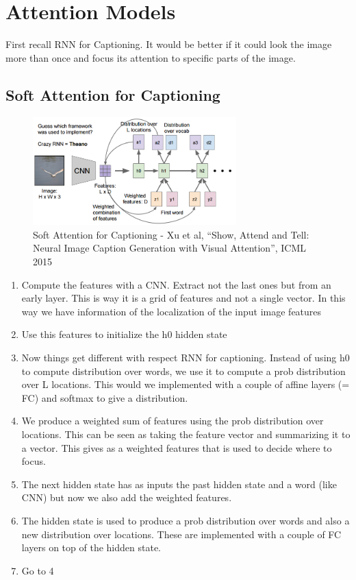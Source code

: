 \chapter{Attention Models}
First recall RNN for Captioning. It would be better if it could look the image more than once and focus its attention to specific parts of the image.

\section*{Soft Attention for Captioning}
\begin{figure}[h]
  \centering
  \includegraphics[width=0.7\textwidth]{Images/attention_models/1.png}
  \caption{Soft Attention for Captioning - Xu et al, “Show, Attend and Tell: Neural Image Caption Generation with Visual Attention”, ICML 2015}
\end{figure}

\begin{enumerate}
\item Compute the features with a CNN. Extract not the last ones but from an early layer. This is way it is a grid of features and not a single vector. In this way we have information of the localization of the input image features
\item Use this features to initialize the h0 hidden state
\item Now things get different with respect RNN for captioning. Instead of using h0 to compute distribution over words, we use it to compute a prob distribution over L locations. This would we implemented with a couple of affine layers (= FC) and softmax to give a distribution.
\item We produce a weighted sum of features using the prob distribution over locations. This can be seen as taking the feature vector and summarizing it to a vector. This gives as a weighted features that is used to decide where to focus.
\item The next hidden state has as inputs the past hidden state and a word (like CNN) but now we also add the weighted features.
\item The hidden state is used to produce a prob distribution over words and also a new distribution over locations. These are implemented with a couple of FC layers on top of the hidden state.
\item Go to 4
\end{enumerate}


